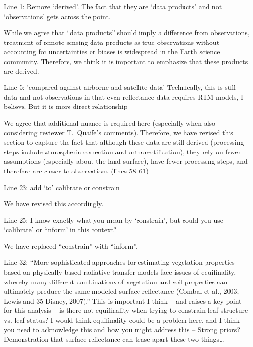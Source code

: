 \begin{reviewer}
  Line 1: Remove ‘derived’. The fact that they are ‘data products’ and not ‘observations’ gets across the point.
\end{reviewer}

While we agree that ``data products'' should imply a difference from observations, treatment of remote sensing data products as true observations without accounting for uncertainties or biases is widespread in the Earth science community.
Therefore, we think it is important to emphasize that these products are derived.

\begin{reviewer}
  Line 5: ‘compared against airborne and satellite data’ Technically, this is still data and not observations in that even reflectance data requires RTM models, I believe. But it is more direct relationship
\end{reviewer}

We agree that additional nuance is required here (especially when also considering reviewer T.\ Quaife’s comments).
Therefore, we have revised this section to capture the fact that although these data are still derived (processing steps include atmospheric correction and orthorectification), they rely on fewer assumptions (especially about the land surface), have fewer processing steps, and therefore are closer to observations (lines 58--61).

\begin{reviewer}
  Line 23: add ‘to’ calibrate or constrain
\end{reviewer}

We have revised this accordingly.

\begin{reviewer}
  Line 25: I know exactly what you mean by ‘constrain’, but could you use ‘calibrate’ or ‘inform’ in this context?
\end{reviewer}

We have replaced ``constrain'' with ``inform''.

\begin{reviewer}
  Line 32: “More sophisticated approaches for estimating vegetation properties based on physically-based radiative transfer models face issues of equifinality, whereby many different combinations of vegetation and soil properties can ultimately produce the same modeled surface reflectance (Combal et al., 2003; Lewis and 35 Disney, 2007).”
  This is important I think – and raises a key point for this analysis – is there not equifinality when trying to constrain leaf structure vs. leaf status? I would think equifinality could be a problem here, and I think you need to acknowledge this and how you might address this – Strong priors? Demonstration that surface reflectance can tease apart these two things\ldots
\end{reviewer}

